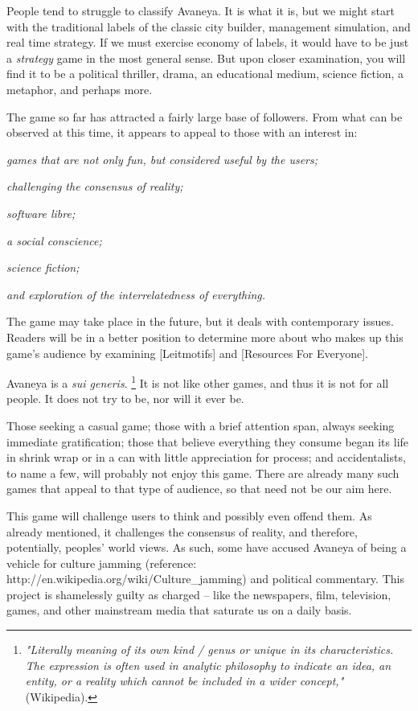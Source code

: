 People tend to struggle to classify Avaneya. It is what it is, but we might start with the traditional labels of the classic city builder, management simulation, and real time strategy. If we must exercise economy of labels, it would have to be just a {\it strategy} game in the most general sense. But upon closer examination, you will find it to be a political thriller, drama, an educational medium, science fiction, a metaphor, and perhaps more.

The game so far has attracted a fairly large base of followers. From what can be observed at this time, it appears to appeal to those with an interest in:

\startitemize[4]
\item
{\it games that are not only fun, but considered useful by the users;}
\item
{\it challenging the consensus of reality;}
\item
{\it software libre;}
\item
{\it a social conscience;}
\item
{\it science fiction;}
\item
{\it and exploration of the interrelatedness of everything.}
\stopitemize

The game may take place in the future, but it deals with contemporary issues. Readers will be in a better position to determine more about who makes up this game's audience by examining [Leitmotifs] and [Resources For Everyone].

Avaneya is a {\it sui generis}. \footnote{{\it "Literally meaning of its own kind / genus or unique in its characteristics. The expression is often used in analytic philosophy to indicate an idea, an entity, or a reality which cannot be included in a wider concept,"} (Wikipedia).} It is not like other games, and thus it is not for all people. It does not try to be, nor will it ever be.

Those seeking a casual game; those with a brief attention span, always seeking immediate gratification; those that believe everything they consume began its life in shrink wrap or in a can with little appreciation for process; and accidentalists, to name a few, will probably not enjoy this game. There are already many such games that appeal to that type of audience, so that need not be our aim here.

This game will challenge users to think and possibly even offend them. As already mentioned, it challenges the consensus of reality, and therefore, potentially, peoples' world views. As such, some have accused Avaneya of being a vehicle for culture jamming (reference: http://en.wikipedia.org/wiki/Culture_jamming) and political commentary. This project is shamelessly guilty as charged -- like the newspapers, film, television, games, and other mainstream media that saturate us on a daily basis. 

